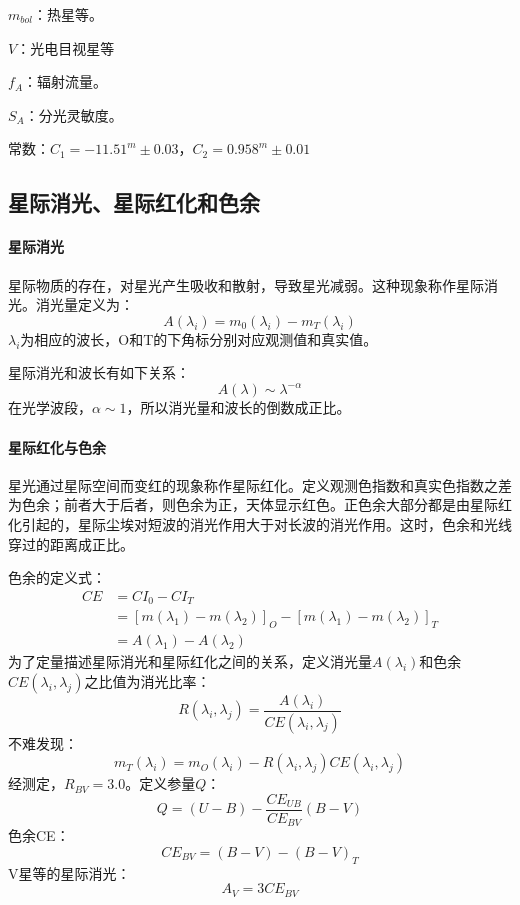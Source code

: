 $m_{bol}$：热星等。

$V$：光电目视星等

$f_{A}$：辐射流量。

$S_{A}$：分光灵敏度。

常数：$C_{1}=-11.51^m\pm 0.03$，$C_{2}=0.958^m\pm 0.01$
\subsection{星际消光、星际红化和色余}
\paragraph{星际消光}
星际物质的存在，对星光产生吸收和散射，导致星光减弱。这种现象称作星际消光。消光量定义为：
\begin{equation}
	A(\lambda_{i})=m_{0}(\lambda_{i})-m_{T}(\lambda_{i})
\end{equation}
$\lambda_{i}$为相应的波长，O和T的下角标分别对应观测值和真实值。

星际消光和波长有如下关系：
\begin{equation}
	A(\lambda)\sim \lambda^{-\alpha}
\end{equation}
在光学波段，$\alpha\sim 1$，所以消光量和波长的倒数成正比。
\paragraph{星际红化与色余}
星光通过星际空间而变红的现象称作星际红化。定义观测色指数和真实色指数之差为色余；前者大于后者，则色余为正，天体显示红色。正色余大部分都是由星际红化引起的，星际尘埃对短波的消光作用大于对长波的消光作用。这时，色余和光线穿过的距离成正比。

色余的定义式：
\begin{equation}
	\begin{split}
		CE&=CI_{0}-CI_{T}\\
		&=\left[m(\lambda_{1})-m(\lambda_{2})\right]_{O}-\left[m(\lambda_{1})-m(\lambda_{2})\right]_{T}\\
		&=A(\lambda_{1})-A(\lambda_{2})
	\end{split}
\end{equation}
为了定量描述星际消光和星际红化之间的关系，定义消光量$A(\lambda_{i})$和色余$CE(\lambda_{i},\lambda_{j})$之比值为消光比率：
\begin{equation}
	R(\lambda_{i},\lambda_{j})=\frac{A(\lambda_{i})}{CE(\lambda_{i},\lambda_{j})}
\end{equation}
不难发现：
\begin{equation}
	m_{T}(\lambda_{i})=m_{O}(\lambda_{i})-R(\lambda_{i},\lambda_{j})CE(\lambda_{i},\lambda_{j})
\end{equation}
经测定，$R_{BV}=3.0$。定义参量$Q$：
\begin{equation}
	Q=(U-B)-\frac{CE_{UB}}{CE_{BV}}(B-V)
\end{equation}
色余CE：
\begin{equation}
	CE_{BV}=(B-V)-(B-V)_{T}
\end{equation}
V星等的星际消光：
\begin{equation}
	A_{V}=3CE_{BV}
\end{equation}
